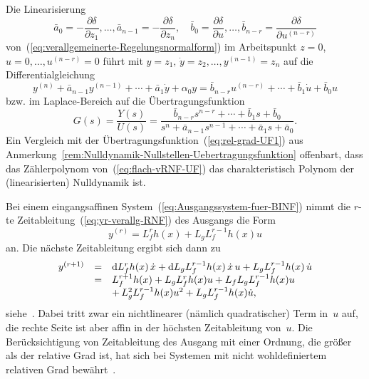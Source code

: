 Die Linearisierung 
\begin{equation}
\bar{a}_{0}=-\frac{\partial\delta}{\partial z_{1}},\ldots,\bar{a}_{n-1}=-\frac{\partial\delta}{\partial z_{n}},\quad\bar{b}_{0}=\frac{\partial\delta}{\partial u},\ldots,\bar{b}_{n-r}=\frac{\partial\delta}{\partial u^{(n-r)}}\label{eq:koeff-linearisierung-verallg-RNF}
\end{equation}
von~(\ref{eq:verallgemeinerte-Regelungsnormalform}) im Arbeitspunkt
$z=0$, $u=0,\ldots,u^{(n-r)}=0$ führt mit $y=z_{1},\,\dot{y}=z_{2},\ldots,y^{(n-1)}=z_{n}$
auf die Differentialgleichung
\[
y^{(n)}+\bar{a}_{n-1}y^{(n-1)}+\cdots+\bar{a}_{1}\dot{y}+\alpha_{0}y=\bar{b}_{n-r}u^{(n-r)}+\cdots+\bar{b}_{1}\dot{u}+\bar{b}_{0}u
\]
bzw. im Laplace-Bereich auf die Übertragungsfunktion 
\begin{equation}
G(s)=\frac{Y(s)}{U(s)}=\frac{\bar{b}_{n-r}s^{n-r}+\cdots+\bar{b}_{1}s+\bar{b}_{0}}{s^{n}+\bar{a}_{n-1}s^{n-1}+\cdots+\bar{a}_{1}s+\bar{a}_{0}}.\label{eq:flach-vRNF-UF}
\end{equation}
Ein Vergleich mit der Übertragungsfunktion~(\ref{eq:rel-grad-UF1})
aus Anmerkung~\ref{rem:Nulldynamik-Nullstellen-Uebertragungsfunktion}
offenbart, dass das Zählerpolynom von~(\ref{eq:flach-vRNF-UF}) das
charakteristisch Polynom der (linearisierten) Nulldynamik ist.

\begin{remark}
\label{rem:Zeitableitungen-Lie-Ableitungen}Bei einem eingangsaffinen
System~(\ref{eq:Ausgangssystem-fuer-BINF}) nimmt die $r$-te Zeit\-ableitung~(\ref{eq:yr-verallg-RNF})
des Ausgangs die Form 
\[
y^{(r)}=L_{f}^{r}h(x)+L_{g}L_{f}^{r-1}h(x)u
\]
an. Die nächste Zeitableitung ergibt sich dann zu
\begin{equation}
\begin{array}{lcl}
y^{(r+1)} & = & {\mathrm{d}} L_{f}^{r}h(x)\,\dot{x}+{\mathrm{d}} L_{g}L_{f}^{r-1}h(x)\,\dot{x}\,u+L_{g}L_{f}^{r-1}h(x)\,\dot{u}\\
 & = & L_{f}^{r+1}h(x)+L_{g}L_{f}^{r}h(x)u+L_{f}L_{g}L_{f}^{r-1}h(x)u\\
 &  & +\,L_{g}^{2}L_{f}^{r-1}h(x)u^{2}+L_{g}L_{f}^{r-1}h(x)\dot{u},
\end{array}\label{eq:yr1-flach-affine-vRNF}
\end{equation}
siehe~\cite{Lamnabhi-Lagarrigue88,zhang2006feedback}. Dabei tritt
zwar ein nichtlinearer (nämlich quadratischer) Term in~$u$ auf,
die rechte Seite ist aber affin in der höchsten Zeitableitung von~$u$.
Die Berücksichtigung von Zeitableitung des Ausgang mit einer Ordnung,
die größer als der relative Grad ist, hat sich bei Systemen mit nicht
wohldefiniertem relativen Grad bewährt~\cite{leith2001}.
\end{remark}

